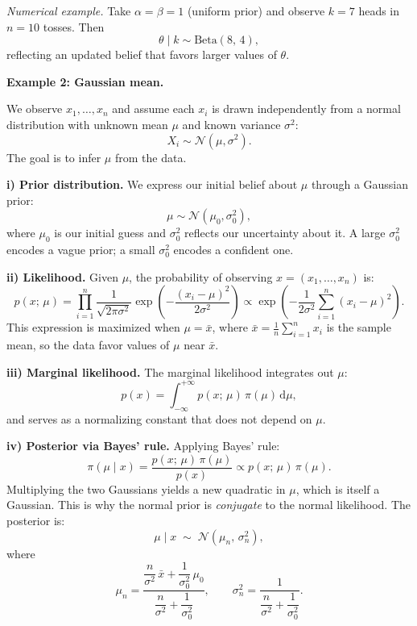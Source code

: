 \textit{Numerical example.} Take $\alpha=\beta=1$ (uniform prior) and observe $k=7$ heads in $n=10$ tosses. Then
\[
    \theta \mid k \sim \mathrm{Beta}(8,\,4),
\]
reflecting an updated belief that favors larger values of $\theta$.

\medskip

\textbf{Example 2: Gaussian mean.}

\medskip

We observe $x_1,\dots,x_n$ and assume each $x_i$ is drawn independently from a normal distribution with unknown mean $\mu$ and known variance $\sigma^2$:
\[
    X_i \sim \mathcal{N}(\mu,\sigma^2).
\]
The goal is to infer $\mu$ from the data.

\medskip

\textbf{i) Prior distribution.} We express our initial belief about $\mu$ through a Gaussian prior:
\[
    \mu \sim \mathcal{N}(\mu_0,\sigma_0^2),
\]
where $\mu_0$ is our initial guess and $\sigma_0^2$ reflects our uncertainty about it. A large $\sigma_0^2$ encodes a vague prior; a small $\sigma_0^2$ encodes a confident one.

\medskip

\textbf{ii) Likelihood.} Given $\mu$, the probability of observing $x = (x_1,\dots,x_n)$ is:
\[
    p(x;\,\mu) = \prod_{i=1}^n \frac{1}{\sqrt{2\pi\sigma^2}}\exp\!\left(-\frac{(x_i-\mu)^2}{2\sigma^2}\right)
    \propto \exp\!\left(-\frac{1}{2\sigma^2}\sum_{i=1}^n (x_i-\mu)^2\right).
\]
This expression is maximized when $\mu = \bar{x}$, where $\bar{x} = \tfrac{1}{n}\sum_{i=1}^n x_i$ is the sample mean, so the data favor values of $\mu$ near $\bar{x}$.

\medskip

\textbf{iii) Marginal likelihood.} The marginal likelihood integrates out $\mu$:
\[
    p(x) = \int_{-\infty}^{+\infty} p(x;\,\mu)\,\pi(\mu)\,\mathrm{d}\mu,
\]
and serves as a normalizing constant that does not depend on $\mu$.

\medskip

\textbf{iv) Posterior via Bayes' rule.} Applying Bayes' rule:
\[
    \pi(\mu \mid x) = \frac{p(x;\,\mu)\,\pi(\mu)}{p(x)} \propto p(x;\,\mu)\,\pi(\mu).
\]
Multiplying the two Gaussians yields a new quadratic in $\mu$, which is itself a Gaussian. This is why the normal prior is \emph{conjugate} to the normal likelihood. The posterior is:
\[
    \mu \mid x \;\sim\; \mathcal{N}\!\left(\mu_n,\,\sigma_n^2\right),
\]
where
\[
    \mu_n = \frac{\dfrac{n}{\sigma^2}\,\bar{x} + \dfrac{1}{\sigma_0^2}\,\mu_0}{\dfrac{n}{\sigma^2}+\dfrac{1}{\sigma_0^2}}, \qquad
    \sigma_n^2 = \frac{1}{\dfrac{n}{\sigma^2}+\dfrac{1}{\sigma_0^2}}.
\]

